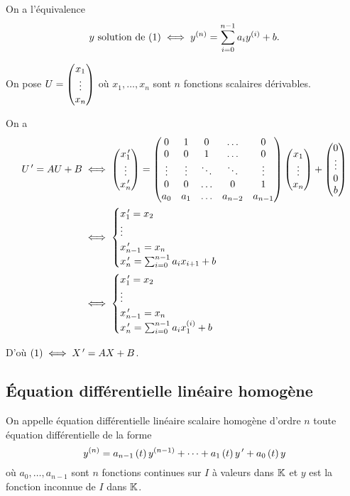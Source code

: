 \begin{dem}
On a l'équivalence \[y\text{ solution de }(1)\iff y^{\left(n\right)}=\sum_{i=0}^{n-1}a_iy^{\left(i\right)}+b.\]

On pose \(U=\begin{pmatrix}x_1\\\vdots\\x_n\end{pmatrix}\) où \(x_1,\dots,x_n\) sont \(n\) fonctions scalaires dérivables.

On a \[\begin{aligned}
U^{\,\prime}=AU+B&\iff\begin{pmatrix}x_1^{\,\prime}\\\vdots\\x_n^{\,\prime}\end{pmatrix}=\begin{pmatrix}
0 & 1 & 0 & \dots & 0 \\
0 & 0 & 1 & \dots & 0 \\
\vdots & \vdots & \ddots & \ddots & \vdots \\
0 & 0 & \dots & 0 & 1 \\
a_0 & a_1 & \dots & a_{n-2} & a_{n-1}
\end{pmatrix}\begin{pmatrix}x_1\\\vdots\\x_n\end{pmatrix}+\begin{pmatrix}
0 \\
\vdots \\
0 \\
b
\end{pmatrix} \\
&\iff\begin{cases}
x_1^{\,\prime}=x_2 \\
\vdots \\
x_{n-1}^{\,\prime}=x_n \\
x_n^{\,\prime}=\sum_{i=0}^{n-1}a_ix_{i+1}+b
\end{cases} \\
&\iff\begin{cases}
x_1^{\,\prime}=x_2 \\
\vdots \\
x_{n-1}^{\,\prime}=x_n \\
x_n^{\,\prime}=\sum_{i=0}^{n-1}a_ix_1^{\left(i\right)}+b
\end{cases}
\end{aligned}\]

D'où \((1)\iff X^{\,\prime}=AX+B\).
\end{dem}

\subsection{Équation différentielle linéaire homogène}

\begin{defi}
On appelle équation différentielle linéaire scalaire homogène d'ordre \(n\) toute équation différentielle de la forme \[y^{\left(n\right)}=a_{n-1}\left(t\right)y^{\left(n-1\right)}+\dots+a_1\left(t\right)y^{\,\prime}+a_0\left(t\right)y\] où \(a_0,\dots,a_{n-1}\) sont \(n\) fonctions continues sur \(I\) à valeurs dans \(\mathbb{K}\) et \(y\) est la fonction inconnue de \(I\) dans \(\mathbb{K}\).
\end{defi}

